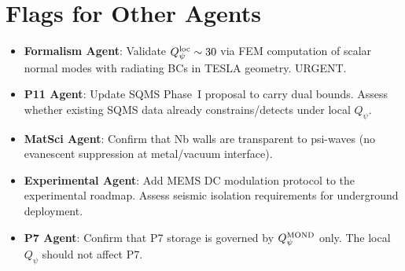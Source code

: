\documentclass[11pt]{article}
\theoremstyle{definition}
\theoremstyle{remark}
\begin{document}
\section*{Flags for Other Agents}

\begin{itemize}[nosep]
\item \textbf{Formalism Agent}: Validate $Q_\psi^{\rm loc} \sim 30$
  via FEM computation of scalar normal modes with radiating BCs in
  TESLA geometry. URGENT.
\item \textbf{P11 Agent}: Update SQMS Phase~I proposal to carry dual
  bounds. Assess whether existing SQMS data already constrains/detects
  under local $Q_\psi$.
\item \textbf{MatSci Agent}: Confirm that Nb walls are transparent to
  psi-waves (no evanescent suppression at metal/vacuum interface).
\item \textbf{Experimental Agent}: Add MEMS DC modulation protocol to
  the experimental roadmap. Assess seismic isolation requirements for
  underground deployment.
\item \textbf{P7 Agent}: Confirm that P7 storage is governed by
  $Q_\psi^{\rm MOND}$ only. The local $Q_\psi$ should not affect P7.
\end{itemize}
\end{document}
